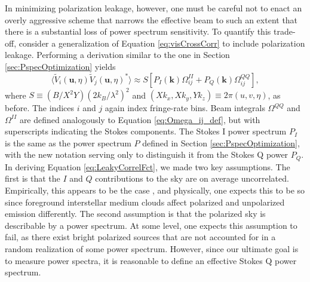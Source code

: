 \documentclass[twocolumn,apj,numberedappendix]{emulateapj}
\begin{document}
In minimizing polarization leakage, however, one must be careful not to enact an overly aggressive
scheme that narrows the effective beam to such an extent that there is a substantial loss of
power spectrum sensitivity. To quantify this trade-off, consider a generalization of Equation
\eqref{eq:visCrossCorr} to include polarization leakage. Performing a derivation similar to the one
in Section \ref{sec:PspecOptimization} yields
\begin{equation}
\label{eq:LeakyCorrelFct}
\langle \widetilde{V}_i(\mathbf{u},\eta) \widetilde{V}_j(\mathbf{u},\eta)^*\rangle \approx S \left[P_I (\mathbf{k}) \Omega_{ij}^{II} + P_Q (\mathbf{k}) \Omega_{ij}^{QQ}\right],
\end{equation}
where $S \equiv ( B / X^2 Y) ( 2 k_B / \lambda^2 )^2$ and $(X k_x, X k_y, Y k_z) \equiv 2 \pi (u , v, \eta)$, as before. The indices $i$ and $j$ again index fringe-rate
bins. Beam integrals $\Omega^{QQ}$ and $\Omega^{II}$ are defined analogously to Equation \eqref{eq:Omega_ij_def},
but with superscripts indicating the Stokes components. The Stokes I power spectrum $P_I$ is the same as the
power spectrum $P$ defined in Section \ref{sec:PspecOptimization}, with the new notation serving only to
distinguish it from the Stokes Q power $P_Q$. In deriving Equation \eqref{eq:LeakyCorrelFct}, we made two
key assumptions. The first is that the $I$ and $Q$ contributions to the sky are on average uncorrelated. Empirically, 
this appears to be the case \citep{wieringa_et_al1993,gaensler_et_al2001,bernardi_et_al2003}, and physically, one expects this to be so since foreground interstellar medium clouds affect polarized and unpolarized
emission differently.
The second assumption is that the polarized sky is describable by a power spectrum. At some level, one expects
this assumption to fail, as there exist bright polarized sources that are not accounted for in a random realization
of some power spectrum. However, since our ultimate goal is to measure power spectra, it is reasonable to
define an effective Stokes Q power spectrum.
\end{document}
